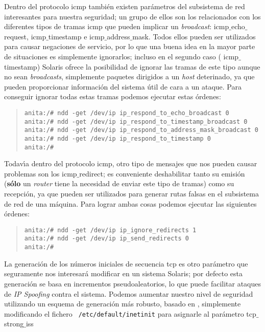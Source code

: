 Dentro del protocolo {\sc icmp} tambi\'en existen par\'ametros del subsistema de
red interesantes para nuestra seguridad; un grupo de ellos son los relacionados
con los diferentes tipos de tramas {\sc icmp} que pueden implicar un {\it 
broadcast}: {\sc icmp$\_$echo$\_$request}, {\sc icmp$\_$timestamp} e {\sc 
icmp$\_$address$\_$mask}. Todos ellos pueden ser utilizados para causar 
negaciones de servicio, por lo que una buena idea en la mayor parte de 
situaciones es simplemente ignorarlos; incluso en el segundo caso ({\sc 
icmp$\_$timestamp}) Solaris ofrece la posibilidad de ignorar las tramas de este
tipo aunque no sean {\it broadcasts}, simplemente paquetes dirigidos a un {\it
host} deterinado, ya que pueden proporcionar informaci\'on del sistema \'util
de cara a un ataque. Para conseguir ignorar todas estas tramas podemos ejecutar 
estas \'ordenes:
\begin{quote}
\begin{verbatim}
anita:/# ndd -get /dev/ip ip_respond_to_echo_broadcast 0
anita:/# ndd -get /dev/ip ip_respond_to_timestamp_broadcast 0
anita:/# ndd -get /dev/ip ip_respond_to_address_mask_broadcast 0
anita:/# ndd -get /dev/ip ip_respond_to_timestamp 0
anita:/#
\end{verbatim}
\end{quote}
Todav\'{\i}a dentro del protocolo {\sc icmp}, otro tipo de mensajes que nos
pueden causar problemas son los {\sc icmp$\_$redirect}; es conveniente 
deshabilitar tanto su emisi\'on ({\bf s\'olo} un {\it router} tiene la necesidad
de enviar este tipo de tramas) como su recepci\'on, ya que pueden ser 
utilizados para generar rutas falsas en el subsistema de red de una m\'aquina.
Para lograr ambas cosas podemos ejecutar las siguientes \'ordenes:
\begin{quote}
\begin{verbatim}
anita:/# ndd -get /dev/ip ip_ignore_redirects 1
anita:/# ndd -get /dev/ip ip_send_redirects 0
anita:/#
\end{verbatim}
\end{quote}
La generaci\'on de los n\'umeros iniciales de secuencia {\sc tcp} es otro
par\'ametro que seguramente nos interesar\'a modificar en un sistema
Solaris; por defecto esta generaci\'on se basa en incrementos pseudoaleatorios,
lo que puede facilitar ataques de {\it IP Spoofing} contra el sistema. Podemos
aumentar nuestro nivel de seguridad utilizando un esquema de generaci\'on m\'as
robusto, basado en \cite{kn:rfc1498}, simplemente modificando el fichero {\tt
/etc/default/inetinit} para asignarle al par\'ametro {\sc tcp$\_$strong$\_$iss}

